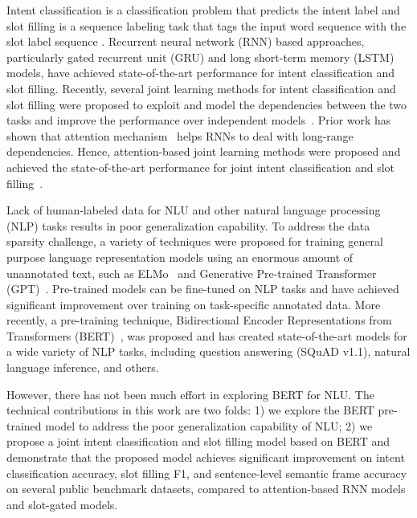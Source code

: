 \documentclass[11pt,a4paper]{article}
\begin{document}
Intent classification is a classification problem that predicts the intent label 
and slot filling is a sequence labeling task that tags the input word sequence  with the slot label sequence . Recurrent neural network (RNN) based approaches, particularly gated recurrent unit (GRU) and long short-term memory (LSTM) models, have achieved state-of-the-art performance for intent classification and slot filling. Recently, several joint learning methods for intent classification and slot filling were proposed to exploit and model the dependencies between the two tasks and improve the performance over independent models~\citep{DBLP:conf/slt/GuoTYZ14,DBLP:conf/interspeech/Hakkani-TurTCCG16,DBLP:conf/interspeech/LiuL16,DBLP:conf/naacl/GooGHHCHC18}. Prior work has shown that attention mechanism~\citep{DBLP:journals/corr/BahdanauCB14} helps RNNs to deal with long-range dependencies.  Hence, attention-based joint learning methods were proposed and achieved the state-of-the-art performance for joint intent classification and slot filling~\citep{DBLP:conf/interspeech/LiuL16,DBLP:conf/naacl/GooGHHCHC18}. 

Lack of human-labeled data for NLU and other natural language processing (NLP) tasks results in poor generalization capability.
To address the data sparsity challenge, a variety of techniques were proposed for training general purpose language representation models using an enormous amount of unannotated text, such as ELMo~\citep{DBLP:conf/naacl/PetersNIGCLZ18} and Generative Pre-trained Transformer (GPT)~\citep{DBLP:techreport/ge1ne8r}. Pre-trained models can be fine-tuned on NLP tasks and have achieved significant improvement over training on task-specific annotated data. More recently, a pre-training technique, Bidirectional Encoder Representations from Transformers (BERT)~\citep{DBLP:journals/corr/abs-1810-04805}, was proposed and has created state-of-the-art models for a wide variety of NLP tasks, including question answering (SQuAD v1.1), natural language inference, and others.

However, there has not been much effort in exploring BERT for NLU. The technical contributions in this work are two folds: 1) we explore the BERT pre-trained model to address the poor generalization capability of NLU; 2) we propose a joint intent classification and slot filling model based on BERT and demonstrate that the proposed model achieves significant improvement on intent classification accuracy, slot filling F1, and sentence-level semantic frame accuracy on several public benchmark datasets, compared to attention-based RNN models and slot-gated models.
\end{document}
